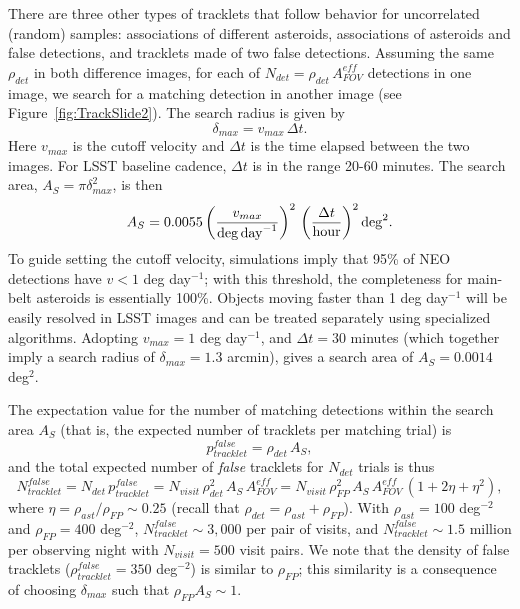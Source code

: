 There are three other types of tracklets that follow behavior for uncorrelated (random)
samples: associations of different asteroids, associations of asteroids and false detections,
and tracklets made of two false detections. Assuming the same $\rho_{det}$ in both
difference images, for each of $N_{det} = \rho_{det} \, A_{FOV}^{eff}$ detections in one image,
we search for a matching detection in another image (see Figure~\ref{fig:TrackSlide2}).
The search radius is given by
\begin{equation}
                     \delta_{max} = v_{max} \, \Delta t .
\end{equation}
Here $v_{max}$ is the  cutoff velocity and $\Delta t$
is the time elapsed between the two images. For LSST baseline cadence, $\Delta t$ is in
the range 20-60 minutes. The search area, $A_S = \pi \delta_{max}^2$, is then
\begin{equation}
\label{eq:AS}
      A_S = 0.0055 \left( v_{max}  \over {\rm deg \, day}^{-1} \right)^2 \, \left(\Delta t \over {\rm hour} \right)^2 {\rm deg}^2.
\end{equation}
To guide setting the cutoff velocity, simulations imply that 95\% of NEO detections have $v<1$ deg day$^{-1}$; with this threshold,
the completeness for main-belt asteroids is essentially 100\%. Objects moving faster than 1 deg day$^{-1}$ will
be easily resolved in LSST images and can be treated separately using specialized algorithms.
Adopting $v_{max} = 1$ deg day$^{-1}$,  and $\Delta t = 30$
minutes (which together  imply a search radius of $\delta_{max} = 1.3$ arcmin), gives a search area of
$A_S = 0.0014$ deg$^2$.


The expectation value for the number of matching detections within the search area $A_S$ (that is, the expected
number of tracklets per matching trial) is
\begin{equation}
                      p_{tracklet}^{false} =   \rho_{det}  \, A_S,
\end{equation}
and the total expected number of {\it false} tracklets for $N_{det}$ trials is thus
\begin{equation}
\label{eq:NttFalse}
           N_{tracklet}^{false} = N_{det} \, p_{tracklet}^{false} =  N_{visit} \, \rho_{det}^2 \, A_S \, A_{FOV}^{eff} = N_{visit} \, \rho^2_{FP}  \, A_S \, A_{FOV}^{eff} \,  \left(1 + 2 \eta + \eta^2\right),
\end{equation}
where $\eta = \rho_{ast}  / \rho_{FP} \sim 0.25$ (recall that $\rho_{det} = \rho_{ast} + \rho_{FP}$).
With $\rho_{ast} = 100$ deg$^{-2}$ and  $\rho_{FP} = 400$ deg$^{-2}$,
$N_{tracklet}^{false} \sim 3,000$ per pair of visits, and $N_{tracklet}^{false} \sim 1.5$ million per observing night with
$N_{visit}=500$ visit pairs. We note that the density of false tracklets ($\rho_{tracklet}^{false}=350$ deg$^{-2}$) is similar to
$\rho_{FP}$; this similarity is a consequence of choosing $\delta_{max}$ such that $\rho_{FP} A_S \sim 1$.

